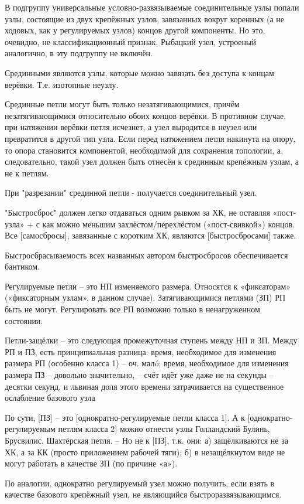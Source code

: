 В подгруппу универсальные условно-развязываемые соединительные узлы попали узлы, состоящие из двух крепёжных узлов, завязанных вокруг коренных (а не ходовых, как у регулируемых узлов) концов другой компоненты. Но это, очевидно, не классификационный признак. Рыбацкий узел, устроеный аналогично, в эту подгруппу не включён.

Срединными являются узлы, которые можно завязать без доступа к концам верёвки. Т.е. изотопные неузлу.

Срединные петли могут быть только незатягивающимися, причём незатягивающимися относительно обоих концов верёвки. В противном случае, при натяжении верёвки петля исчезнет, а узел выродится в неузел или превратится в другой тип узла. Если перед натяжением петля накинута на опору, то опора становится компонентой, необходимой для сохранения топологии, а, следовательно, такой узел должен быть отнесён к срединным крепёжным узлам, а не к петлям.

При "разрезании" срединной петли - получается соединительный узел.

"Быстросброс" должен легко отдаваться  одним рывком за ХК, не оставляя «пост-узла» + с как можно меньшим захлёстом/перехлёстом («пост-свивкой») концов.
Все [самосбросы], завязанные с коротким ХК, являются [быстросбросами] также.

Быстросбрасываемость всех названных автором быстросбросов обеспечивается бантиком.

Регулируемые петли – это НП изменяемого размера. Относятся к «фиксаторам» («фиксаторным узлам», в данном случае).  Затягивающимися петлями (ЗП) РП быть не могут. Регулировать все РП возможно только в ненагруженном состоянии.

Петли-защёлки – это следующая промежуточная ступень между НП и ЗП.
Между РП и ПЗ, есть принципиальная разница: время, необходимое для изменения размера РП  (особенно класса 1)  –  оч. малó; время, необходимое для изменения размера ПЗ  –  довольно значительно, – счёт идёт уже даже не на секунды – десятки секунд, и львиная доля этого времени затрачивается на существенное ослабление базового узла

По сути, [ПЗ]  –  это [однократно-регулируемые петли класса 1].
А к [однократно-регулируемым петлям класса 2] можно отнести узлы Голландский Булинь, Брусвилис, Шахтёрская петля. – Но не к [ПЗ], т.к. они:
а) защёлкиваются не за ХК, а за КК  (просто приложением рабочей тяги);
б) в незащёлкнутом виде  не могут работать в качестве ЗП  (по причине «а»).

По аналогии, однократно регулируемый узел можно получить, если взять в качестве базового крепёжный узел, не являющийся быстроразвязывающимся.

